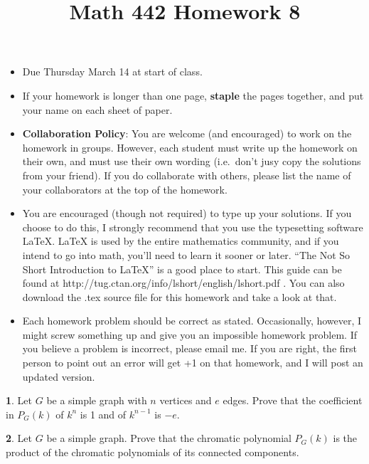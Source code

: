 \documentclass[12pt]{article}
\title{\vspace{-2.0cm}Math 442 Homework 8}
\date{}
\theoremstyle{definition}
\newtheorem{problem}{}
\begin{document}
%
%
\maketitle
%
\vspace{-16 mm}
\begin{itemize}
\item Due Thursday March 14 at start of class.
%
\item If your homework is longer than one page, {\bf staple} the pages together, and put your name on each sheet of paper.
%
\item {\bf Collaboration Policy}: You are welcome (and encouraged) to work on the homework in groups. However, each student must write up the homework on their own, and must use their own wording (i.e.~don't jusy copy the solutions from your friend). If you do collaborate with others, please list the name of your collaborators at the top of the homework.

\item You are encouraged (though not required) to type up your solutions. If you choose to do this, I strongly recommend that you use the typesetting software LaTeX. LaTeX is used by the entire mathematics community, and if you intend to go into math, you’ll need to learn it sooner or later. ``The Not So Short Introduction to LaTeX'' is a good place to start. This guide can be found at http://tug.ctan.org/info/lshort/english/lshort.pdf . You can also download the .tex source file for this homework and take a look at that.

\item Each homework problem should be correct as stated. Occasionally, however, I might screw something up and give you an impossible homework problem. If you believe a problem is incorrect, please email me. If you are right, the first person to point out an error will get +1 on that homework, and I will post an updated version. 
\end{itemize}

\begin{problem}  Let $G$ be a simple graph with $n$ vertices and $e$ edges. Prove that the coefficient in $P_G(k)$ of $k^n$ is 1 and of $k^{n-1}$ is $-e$.
\end{problem}

\begin{problem}  Let $G$ be a simple graph. Prove that the chromatic polynomial $P_G(k)$ is the product of the chromatic polynomials of its connected components. 
\end{problem}
\end{document}
